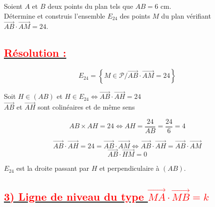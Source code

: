 \documentclass[12pt,a4paper]{article}
\newcounter{solution}
\begin{document}
Soient $A$ et $B$ deux points du plan tels que $AB = 6\text{ cm}$. \\
Détermine et construis l'ensemble $E_{24}$ des points $M$ du plan vérifiant $\overrightarrow{AB} \cdot \overrightarrow{AM} = 24$.

\subsection*{\underline{\textbf{\textcolor{red}{Résolution :}}}}

\[
E_{24} = \left\{ M \in \mathcal{P} \big/ \overrightarrow{AB} \cdot \overrightarrow{AM} = 24 \right\}
\]

Soit $H \in (AB)$ et $H \in E_{24} \iff \overrightarrow{AB} \cdot \overrightarrow{AH} = 24$ \\
$\overrightarrow{AB}$ et $\overrightarrow{AH}$ sont colinéaires et de même sens

\[
AB \times AH = 24 \iff AH = \frac{24}{AB} = \frac{24}{6} = 4
\]

\[
\overrightarrow{AB} \cdot \overrightarrow{AH} = 24 = \overrightarrow{AB} \cdot \overrightarrow{AM} \iff \overrightarrow{AB} \cdot \overrightarrow{AH} = \overrightarrow{AB} \cdot \overrightarrow{AM}
\]
\[
\overrightarrow{AB} \cdot \overrightarrow{HM} = 0
\]

$E_{24}$ est la droite passant par $H$ et perpendiculaire à $(AB)$.

\vspace{0.5cm}

\begin{center}
\end{center}

\subsection*{\underline{\textbf{\textcolor{red}{3) Ligne de niveau du type $\overrightarrow{MA} \cdot \overrightarrow{MB} = k$}}}}
\end{document}
